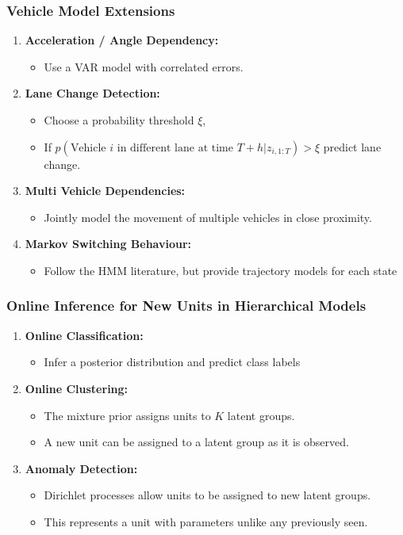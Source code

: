 \documentclass[11pt]{beamer}\usepackage[]{graphicx}\usepackage[]{color}
\begin{document}
\begin{frame}
\frametitle{Vehicle Model Extensions}
\begin{enumerate}
\item \textbf{Acceleration / Angle Dependency:} 
\begin{itemize} 
\item Use a VAR model with correlated errors.
\end{itemize}
\pause
\item \textbf{Lane Change Detection:} 
\begin{itemize}
\item Choose a probability threshold $\xi$,
\item If $p(\mbox{Vehicle $i$ in different lane at time } T + h | z_{i, 1:T}) > \xi$ predict lane change.
\end{itemize}
\pause
\item \textbf{Multi Vehicle Dependencies:}
\begin{itemize}
\item Jointly model the movement of multiple vehicles in close proximity.
\end{itemize}
\pause
\item \textbf{Markov Switching Behaviour:}
\begin{itemize}
\item Follow the HMM literature, but provide trajectory models for each state
\end{itemize}
\end{enumerate}
\end{frame}

\begin{frame}
\frametitle{Online Inference for New Units in Hierarchical Models}
\begin{enumerate}
\item \textbf{Online Classification:}
\begin{itemize}
\item Infer a posterior distribution and predict class labels
\end{itemize}
\pause
\item \textbf{Online Clustering:} 
\begin{itemize}
\item The mixture prior assigns units to $K$ latent groups.
\item A new unit can be assigned to a latent group as it is observed.
\end{itemize}
\pause
\item \textbf{Anomaly Detection:}
\begin{itemize} 
\item Dirichlet processes allow units to be assigned to new latent groups.
\item This represents a unit with parameters unlike any previously seen.
\end{itemize}
\end{enumerate}
\end{frame}
\end{document}
